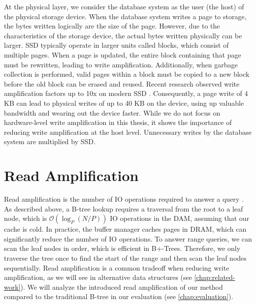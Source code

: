 At the physical layer, we consider the database system as the user (the host) of the physical storage device.
When the database system writes a page to storage, the bytes written logically are the size of the page.
However, due to the characteristics of the storage device, the actual bytes written physically can be larger.
\ac{SSD} typically operate in larger units called blocks, which consist of multiple pages.
When a page is updated, the entire block containing that page must be rewritten, leading to write amplification.
Additionally, when garbage collection is performed, valid pages within a block must be copied to a new block before the old block can be erased and reused.
Recent research observed write amplification factors up to 10x on modern \ac{SSD} \cite{haas2025ssd}.
Consequently, a page write of 4 KB can lead to physical writes of up to 40 KB on the device, using up valuable bandwidth and wearing out the device faster.
While we do not focus on hardware-level write amplification in this thesis, it shows the importance of reducing write amplification at the host level.
Unnecessary writes by the database system are multiplied by \ac{SSD}.


\section{Read Amplification}
Read amplification is the number of \ac{IO} operations required to answer a query \cite{kuszmaul2014fractal}.
As described above, a B-tree lookup requires a traversal from the root to a leaf node, which is $\mathcal{O}(\log_P(N/P))$ \ac{IO} operations in the \ac{DAM}, assuming that our cache is cold.
In practice, the buffer manager caches pages in \ac{DRAM}, which can significantly reduce the number of \ac{IO} operations.
To answer range queries, we can scan the leaf nodes in order, which is efficient in B+-Trees.
Therefore, we only traverse the tree once to find the start of the range and then scan the leaf nodes sequentially.
Read amplification is a common tradeoff when reducing write amplification, as we will see in alternative data structures (see \autoref{chap:related-work}).
We will analyze the introduced read amplification of our method compared to the traditional B-tree in our evaluation (see \autoref{chap:evaluation}).

